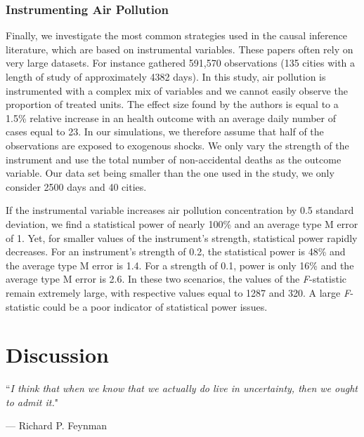 \documentclass[12pt]{article}
\begin{document}
        \subsubsection*{Instrumenting Air Pollution}
        
            Finally, we investigate the most common strategies used in the causal inference literature, which are based on instrumental variables. These papers often rely on very large datasets. For instance \cite{schwartz_national_2018} gathered 591,570 observations (135 cities with a length of study of approximately 4382 days). In this study, air pollution is instrumented with a complex mix of variables and we cannot easily observe the proportion of treated units. The effect size found by the authors is equal to a 1.5\% relative increase in an health outcome with an average daily number of cases equal to 23. In our simulations, we therefore assume that half of the observations are exposed to exogenous shocks. We only vary the strength of the instrument and use the total number of non-accidental deaths as the outcome variable. Our data set being smaller than the one used in the study, we only consider 2500 days and 40 cities.
            
            If the instrumental variable increases air pollution concentration by 0.5 standard deviation, we find a statistical power of nearly 100\% and an average type M error of 1. Yet, for smaller values of the instrument's strength, statistical power rapidly decreases. For an instrument's strength of 0.2, the statistical power is 48\% and the average type M error is 1.4. For a strength of 0.1, power is only 16\% and the average type M error is 2.6. In these two scenarios, the values of the \textit{F}-statistic remain extremely large, with respective values equal to 1287 and 320. A large \textit{F}-statistic could be a poor indicator of statistical power issues.




\section{Discussion}

\epigraph{``\textit{I think that when we know that we actually do live in uncertainty, then we ought to admit it.}"}{--- Richard P. Feynman}
\end{document}
